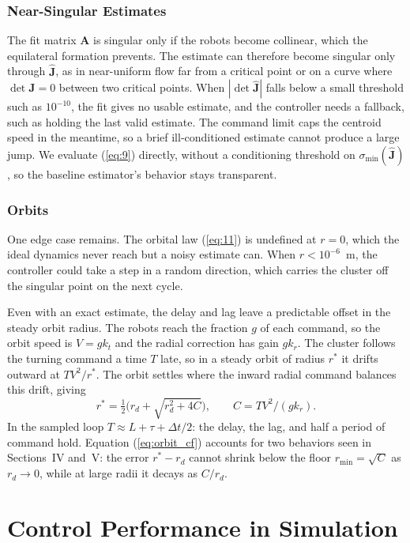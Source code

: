 \documentclass[lettersize,journal]{IEEEtran}
\begin{document}
\subsubsection{Near-Singular Estimates}
The fit matrix $\mathbf{A}$ is singular only if the robots become collinear, which the equilateral formation prevents. The estimate can therefore become singular only through $\hat{\mathbf{J}}$, as in near-uniform flow far from a critical point or on a curve where $\det\mathbf{J} = 0$ between two critical points. When $|\det\hat{\mathbf{J}}|$ falls below a small threshold such as $10^{-10}$, the fit gives no usable estimate, and the controller needs a fallback, such as holding the last valid estimate.
The command limit caps the centroid speed in the meantime, so a brief ill-conditioned estimate cannot produce a large jump. We evaluate (\ref{eq:9}) directly, without a conditioning threshold on $\sigma_{\min}(\hat{\mathbf{J}})$, so the baseline estimator's behavior stays transparent.

\subsubsection{Orbits}
One edge case remains. The orbital law (\ref{eq:11}) is undefined at $r = 0$, which the ideal dynamics never reach but a noisy estimate can. When $r < 10^{-6}$~m, the controller could take a step in a random direction, which carries the cluster off the singular point on the next cycle.

Even with an exact estimate, the delay and lag leave a predictable offset in the steady orbit radius. The robots reach the fraction $g$ of each command, so the orbit speed is $V = gk_t$ and the radial correction has gain $gk_r$. The cluster follows the turning command a time $T$ late, so in a steady orbit of radius $r^*$ it drifts outward at $TV^2/r^*$. The orbit settles where the inward radial command balances this drift, giving
\begin{equation}\label{eq:orbit_cf}
r^* = \tfrac{1}{2}\bigl(r_d + \sqrt{r_d^2 + 4C}\bigr), \qquad C = TV^2/(gk_r).
\end{equation}
In the sampled loop $T \approx L + \tau + \Delta t/2$: the delay, the lag, and half a period of command hold. Equation (\ref{eq:orbit_cf}) accounts for two behaviors seen in Sections~IV and~V: the error $r^* - r_d$ cannot shrink below the floor $r_{\min} = \sqrt{C}$ as $r_d \to 0$, while at large radii it decays as $C/r_d$.



\section{Control Performance in Simulation}
\end{document}
